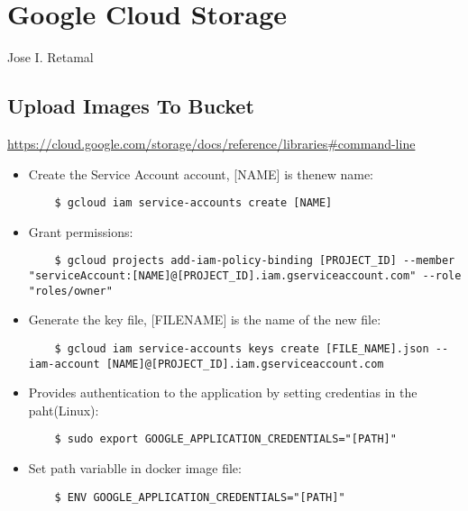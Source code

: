 \chapter{Google Cloud Storage}{Jose I. Retamal }


\section{Upload Images To Bucket}

\url{https://cloud.google.com/storage/docs/reference/libraries#command-line}

\begin{itemize}
	\item Create the Service Account account, [NAME] is thenew name:
	
	\begin{verbatim}
	$ gcloud iam service-accounts create [NAME]
	\end{verbatim}
	
	\item Grant permissions:
	
	\begin{verbatim}
	$ gcloud projects add-iam-policy-binding [PROJECT_ID] --member "serviceAccount:[NAME]@[PROJECT_ID].iam.gserviceaccount.com" --role "roles/owner"
	\end{verbatim}
	
	\item Generate the key file, [FILENAME] is the name of the new file:
		
	\begin{verbatim}
	$ gcloud iam service-accounts keys create [FILE_NAME].json --iam-account [NAME]@[PROJECT_ID].iam.gserviceaccount.com
	\end{verbatim}
	
	
	\item Provides authentication to the application by setting credentias in the paht(Linux):
	
	\begin{verbatim}
	$ sudo export GOOGLE_APPLICATION_CREDENTIALS="[PATH]"
	\end{verbatim}
	
	\item Set path variablle in docker image file:
	
	\begin{verbatim}
	$ ENV GOOGLE_APPLICATION_CREDENTIALS="[PATH]"
	\end{verbatim}
	

\end{itemize}
